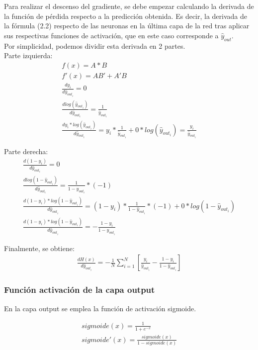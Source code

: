 Para realizar el descenso del gradiente, se debe empezar calculando la derivada de la función de pérdida respecto a la predicción obtenida. Es decir, la derivada de la fórmula (2.2) respecto de las neuronas en la última capa de la red tras aplicar sus respectivas funciones de activación, que en este caso corresponde a $\hat{y}_{out}$. \\
Por simplicidad, podemos dividir esta derivada en 2 partes. \\
Parte izquierda:
\begin{gather}
	f(x) = A*B \\  
	f'(x) = AB' + A'B \\
	\frac{dy_i}{d\hat{y}_{out_i}} = 0 \\
	\frac{dlog(\hat{y}_{out_i} )}{d\hat{y}_{out_i}} = \frac{1}{\hat{y}_{out_i}} \\
	\frac{dy_i * log( \hat{y}_{out_i})}{d\hat{y}_{out_i}} = y_i*\frac{1}{\hat{y}_{out_i}} + 0*log(\hat{y}_{out_i} ) = \frac{y_i}{\hat{y}_{out_i}}
\end{gather}

Parte derecha:
\begin{gather}
	\frac{d(1-y_i)}{d\hat{y}_{out_i}} = 0\\
	\frac{dlog(1-\hat{y}_{out_i})}{d\hat{y}_{out_i}} = \frac{1}{1-\hat{y}_{out_i}} * (-1) \\
	\frac{d(1-y_i)*log(1-\hat{y}_{out_i})}{d\hat{y}_{out_i}} = (1-y_i)*\frac{1}{1-\hat{y}_{out_i}}*(-1) + 0* log(1-\hat{y}_{out_i}) \\
	\frac{d(1-y_i)*log(1-\hat{y}_{out_i})}{d\hat{y}_{out_i}} = -\frac{1-y_i}{1-\hat{y}_{out_i}}
\end{gather}

Finalmente, se obtiene: 
\begin{gather}
    \frac{dH(x)}{d\hat{y}_{out_i}} = - \frac{1}{N} \sum_{i=1}^{N}  [ \frac{y_i}{\hat{y}_{out_i}} - \frac{1-y_i}{1-\hat{y}_{out_i}} ]
\end{gather}

\subsubsection{Función activación de la capa output}
En la capa output se emplea la función de activación sigmoide. 

\begin{gather}
	sigmoide(x) = \frac{1}{1+e^{-x}} \\
	sigmoide'(x) = \frac{sigmoide(x)}{1-sigmoide(x)}
\end{gather}

